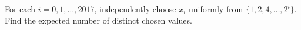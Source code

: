 For each $ i=0,1,\ldots,2017 $, independently choose $ x_i $ uniformly from $\{1,2,4,\ldots,2^i\}$. Find the expected number of distinct chosen values.
